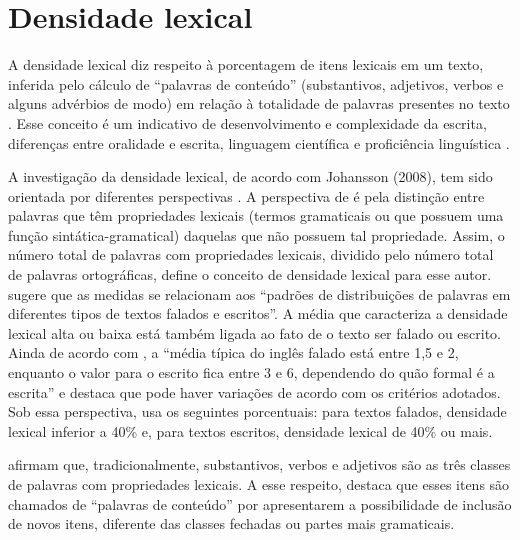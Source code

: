 \documentclass[portuguese]{textolivre}
\begin{document}
\section{Densidade lexical}\label{sec-normas}
A densidade lexical diz respeito à porcentagem de itens lexicais em um texto, inferida pelo cálculo de “palavras de conteúdo” (substantivos, adjetivos, verbos e alguns advérbios de modo) em relação à totalidade de palavras presentes no texto \cite{ure_lexical_1971,ure_register_1977,halliday_spoken_1985,halliday_grammatical_1993}. Esse conceito é um indicativo de desenvolvimento e complexidade da escrita, diferenças entre oralidade e escrita, linguagem científica \cite{halliday_grammatical_1993} e proficiência linguística \cite{halliday_spoken_1987,halliday_grammatical_1993,halliday_part_1989,colombi_academic_2000}.

A investigação da densidade lexical, de acordo com Johansson (2008), tem sido orientada por diferentes perspectivas \cite{ure_lexical_1971,ure_register_1977,halliday_spoken_1985,halliday_grammatical_1993}. A perspectiva de \textcite{ure_lexical_1971} é pela distinção entre palavras que têm propriedades lexicais (termos gramaticais ou que possuem uma função sintática-gramatical) daquelas que não possuem tal propriedade. Assim, o número total de palavras com propriedades lexicais, dividido pelo número total de palavras ortográficas, define o conceito de densidade lexical para esse autor. \textcite[p. 65]{halliday_spoken_1985} sugere que as medidas se relacionam aos “padrões de distribuições de palavras em diferentes tipos de textos falados e escritos”. A média que caracteriza a densidade lexical alta ou baixa está também ligada ao fato de o texto ser falado ou escrito. Ainda de acordo com \textcite[p. 80]{halliday_spoken_1985}, a “média típica do inglês falado está entre 1,5 e 2, enquanto o valor para o escrito fica entre 3 e 6, dependendo do quão formal é a escrita” e destaca que pode haver variações de acordo com os critérios adotados. Sob essa perspectiva, \textcite{johansson_lexical_2008} usa os seguintes porcentuais: para textos falados, densidade lexical inferior a 40\% e, para textos escritos, densidade lexical de 40\% ou mais. 

\textcite{ure_register_1977} afirmam que, tradicionalmente, substantivos, verbos e adjetivos são as três classes de palavras com propriedades lexicais. A esse respeito, \textcite{johansson_lexical_2008} destaca que esses itens são chamados de “palavras de conteúdo” por apresentarem a possibilidade de inclusão de novos itens, diferente das classes fechadas ou partes mais gramaticais. 
\end{document}
